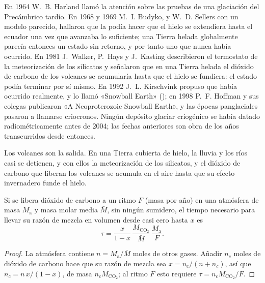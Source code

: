 \begin{history}
En 1964 W.~B. Harland llamó la atención sobre las pruebas de una glaciación del Precámbrico tardío. En
1968 y 1969 M.~I. Budyko, y W.~D. Sellers con un modelo parecido, hallaron que la
 podía hacer que el hielo se extendiera hasta el ecuador una vez que avanzaba lo suficiente; una
Tierra helada globalmente parecía entonces un estado sin retorno, y por tanto uno que nunca había ocurrido.
En 1981 J.~Walker, P.~Hays y J.~Kasting describieron el termostato de la meteorización de los silicatos y
señalaron que en una Tierra helada el dióxido de carbono de los volcanes se acumularía hasta que el hielo
se fundiera: el estado podía terminar por sí mismo. En 1992 J.~L. Kirschvink propuso que había ocurrido
realmente, y lo llamó «Snowball Earth» (); en 1998 P.~F. Hoffman y sus colegas publicaron
«A Neoproterozoic Snowball Earth», y las épocas panglaciales pasaron a llamarse criocronos. Ningún
depósito glaciar criogénico se había datado radiométricamente antes de 2004; las fechas anteriores son
obra de los años transcurridos desde entonces.
\end{history}

Los volcanes son la salida. En una Tierra cubierta de hielo, la lluvia y los ríos casi se detienen, y con ellos la
meteorización de los silicatos, y el dióxido de carbono que liberan los volcanes se acumula en el aire
hasta que su efecto invernadero funde el hielo.

\begin{proposition}\label{prop:b2:precambrian-earth:co2}
Si se libera dióxido de carbono a un ritmo $F$ (masa por año) en una atmósfera de masa
$M_{\text{a}}$ y masa molar media $\bar M$, sin ningún sumidero, el tiempo necesario para llevar su razón de
mezcla en volumen desde casi cero hasta $x$ es
\[
  \tau = \frac{x}{1 - x}\,\frac{M_{\mathrm{CO_2}}}{\bar M}\,\frac{M_{\text{a}}}{F} .
\]
\end{proposition}

\begin{proof}
La atmósfera contiene $n = M_{\text{a}}/\bar M$ moles de otros gases. Añadir $n_c$ moles de
dióxido de carbono hace que su razón de mezcla sea $x = n_c/(n + n_c)$, así que $n_c = n\,x/(1 - x)$, de masa
$n_c M_{\mathrm{CO_2}}$; al ritmo $F$ esto requiere $\tau = n_c M_{\mathrm{CO_2}}/F$.
\end{proof}

